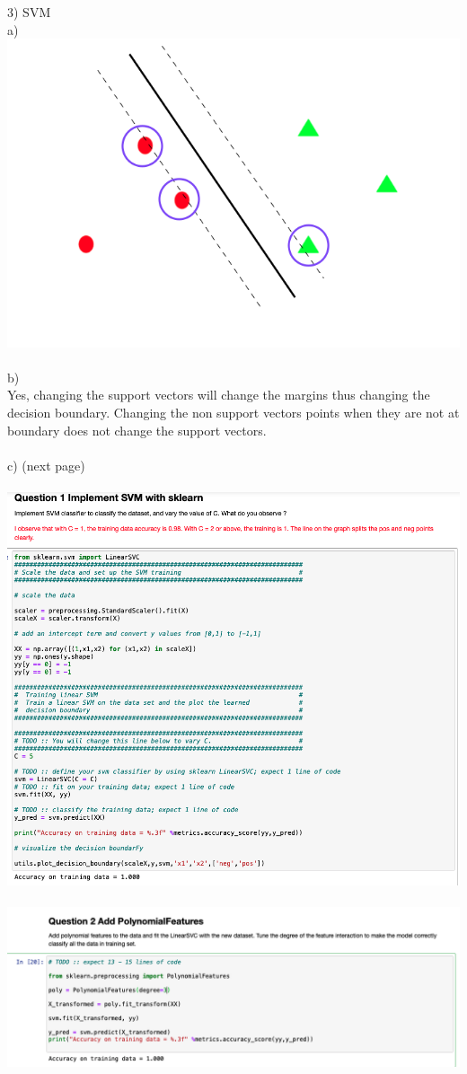 \documentclass[11pt]{article}
\begin{document}
3) SVM \\ 
a) \\
\includegraphics[scale=0.33]{drawsvm} \\ \\ 
b) \\
Yes, changing the support vectors will change the margins thus changing the decision boundary. Changing the non support vectors points when they are not at boundary does not change the support vectors. \\  \\ 
c) (next page)\\ \\
\includegraphics[scale=0.33]{svm1} \\ \\
\includegraphics[scale=0.33]{svm2}
\end{document}
